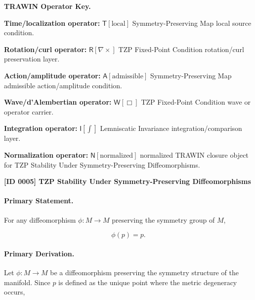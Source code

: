 \par\vspace{0.45\baselineskip}
\noindent\begin{minipage}[t]{\linewidth}
\begingroup
\small
\raggedright
\textbf{TRAWIN Operator Key.}\par
\noindent\textbf{Time/localization operator:} $\mathsf{T}\!\left[\mathrm{local}\right]$ Symmetry-Preserving Map local source condition.\par
\noindent\textbf{Rotation/curl operator:} $\mathsf{R}\!\left[\nabla\times\right]$ TZP Fixed-Point Condition rotation/curl preservation layer.\par
\noindent\textbf{Action/amplitude operator:} $\mathsf{A}\!\left[\mathrm{admissible}\right]$ Symmetry-Preserving Map admissible action/amplitude condition.\par
\noindent\textbf{Wave/d'Alembertian operator:} $\mathsf{W}\!\left[\Box\right]$ TZP Fixed-Point Condition wave or operator carrier.\par
\noindent\textbf{Integration operator:} $\mathsf{I}\!\left[\int\right]$ Lemniscatic Invariance integration/comparison layer.\par
\noindent\textbf{Normalization operator:} $\mathsf{N}\!\left[\mathrm{normalized}\right]$ normalized TRAWIN closure object for TZP Stability Under Symmetry-Preserving Diffeomorphisms.\par
\endgroup
\end{minipage}

\clearpage
\noindent\textbf{[ID 0005] TZP Stability Under Symmetry-Preserving Diffeomorphisms}\par
\vspace{0.35em}
\paragraph{Primary Statement.}
For any diffeomorphism $\phi:M\to M$ preserving the symmetry group of $M$,

\begin{equation}
\phi(p)=p .
\end{equation}

\paragraph{Primary Derivation.}
Let $\phi:M\to M$ be a diffeomorphism preserving the symmetry structure of the manifold. Since $p$ is defined as the unique point where the metric degeneracy occurs,

